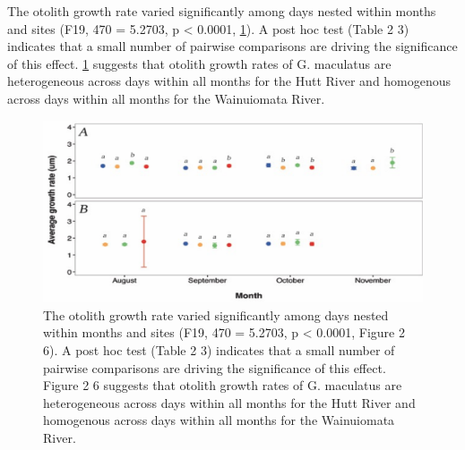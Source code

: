 \documentclass[]{book}
\begin{document}
The otolith growth rate varied significantly among days nested within
months and sites (F19, 470 = 5.2703, p \textless{} 0.0001,
\ref{fig:growthratebyday}). A post hoc test (Table 2 3) indicates that a
small number of pairwise comparisons are driving the significance of
this effect. \ref{fig:growthratebyday} suggests that otolith growth
rates of G. maculatus are heterogeneous across days within all months
for the Hutt River and homogenous across days within all months for the
Wainuiomata River.

\begin{figure}
\centering
\includegraphics{images/growthratebyday.png}
\caption{\label{fig:growthratebyday}The otolith growth rate varied
significantly among days nested within months and sites (F19, 470 =
5.2703, p \textless{} 0.0001, Figure 2 6). A post hoc test (Table 2 3)
indicates that a small number of pairwise comparisons are driving the
significance of this effect. Figure 2 6 suggests that otolith growth
rates of G. maculatus are heterogeneous across days within all months
for the Hutt River and homogenous across days within all months for the
Wainuiomata River.}
\end{figure}
\end{document}
